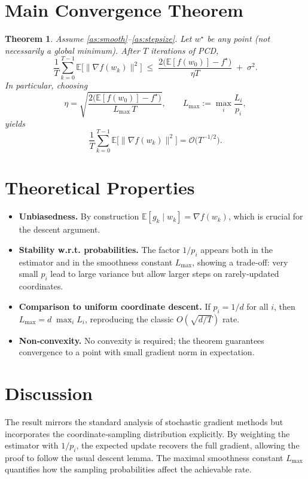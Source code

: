 \documentclass{article}
\newtheorem{theorem}{Theorem}
\begin{document}
\section*{Main Convergence Theorem}
\begin{theorem}\label{thm:main}
Assume \ref{as:smooth}–\ref{as:stepsize}. Let $w^\star$ be any point (not necessarily a global minimum). After $T$ iterations of PCD,
\[
    \frac{1}{T}\sum_{k=0}^{T-1}\mathbb{E}\!\bigl[\|\nabla f(w_k)\|^2\bigr]
    \;\le\;
    \frac{2\bigl(\mathbb{E}[f(w_0)]-f^\star\bigr)}{\eta T}
    \;+\;
    \sigma^2 .
\]
In particular, choosing
\[
    \eta = \sqrt{\frac{2\bigl(\mathbb{E}[f(w_0)]-f^\star\bigr)}{L_{\max}\,T}},
    \qquad
    L_{\max}:=\max_{i}\frac{L_i}{p_i},
\]
yields
\[
    \frac{1}{T}\sum_{k=0}^{T-1}\mathbb{E}\!\bigl[\|\nabla f(w_k)\|^2\bigr]
    =\mathcal{O}\!\bigl(T^{-1/2}\bigr).
\]
\end{theorem}

\section*{Theoretical Properties}
\begin{itemize}[leftmargin=*]
    \item \textbf{Unbiasedness.} By construction $\mathbb{E}[g_k\mid w_k]=\nabla f(w_k)$, which is crucial for the descent argument.
    \item \textbf{Stability w.r.t. probabilities.} The factor $1/p_i$ appears both in the estimator and in the smoothness constant $L_{\max}$, showing a trade‑off: very small $p_i$ lead to large variance but allow larger steps on rarely‑updated coordinates.
    \item \textbf{Comparison to uniform coordinate descent.} If $p_i=1/d$ for all $i$, then $L_{\max}=d\;\max_i L_i$, reproducing the classic $O(\sqrt{d/T})$ rate.
    \item \textbf{Non‑convexity.} No convexity is required; the theorem guarantees convergence to a point with small gradient norm in expectation.
\end{itemize}

\section*{Discussion}
The result mirrors the standard analysis of stochastic gradient methods but incorporates the coordinate‑sampling distribution explicitly. By weighting the estimator with $1/p_i$, the expected update recovers the full gradient, allowing the proof to follow the usual descent lemma. The maximal smoothness constant $L_{\max}$ quantifies how the sampling probabilities affect the achievable rate.
\end{document}
